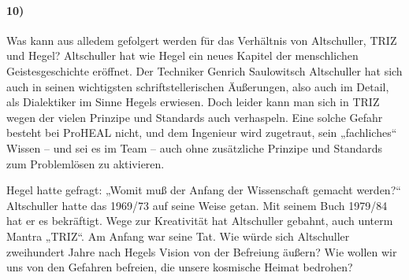 \documentclass[12pt,a4paper]{article}
\begin{document}
\paragraph{10)} 
Was kann aus alledem gefolgert werden für das Verhältnis von Altschuller,
TRIZ und Hegel? Altschuller hat wie Hegel ein neues Kapitel der menschlichen
Geistesgeschichte eröffnet. Der Techniker Genrich Saulowitsch Altschuller hat
sich auch in seinen wichtigsten schriftstellerischen Äußerungen, also auch im
Detail, als Dialektiker im Sinne Hegels erwiesen. Doch leider kann man sich in
TRIZ wegen der vielen Prinzipe und Standards auch verhaspeln. Eine solche
Gefahr besteht bei ProHEAL nicht, und dem Ingenieur wird zugetraut, sein
„fachliches“ Wissen – und sei es im Team – auch ohne zusätzliche Prinzipe und
Standards zum Problemlösen zu aktivieren.

Hegel hatte gefragt: „Womit muß der Anfang der Wissenschaft gemacht werden?“
Altschuller hatte das 1969/73 auf seine Weise getan. Mit seinem Buch 1979/84
hat er es bekräftigt. Wege zur Kreativität hat Altschuller gebahnt, auch unterm
Mantra „TRIZ“. Am Anfang war seine Tat. Wie würde sich Altschuller zweihundert
Jahre nach Hegels Vision von der Befreiung äußern? Wie wollen wir uns von den
Gefahren befreien, die unsere kosmische Heimat bedrohen?
\ccnotice
\end{document}
